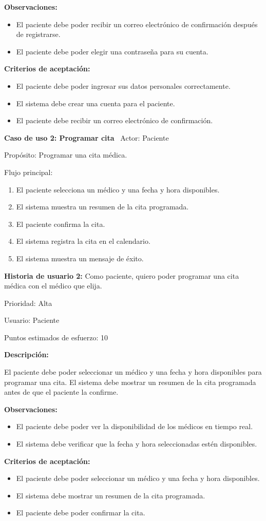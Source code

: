 \documentclass{article}
\theoremstyle{mytheoremstyle}
\theoremstyle{mytheoremstyle}
\theoremstyle{myproblemstyle}
\begin{document}
\textbf {Observaciones:}

\begin{itemize}
    \item El paciente debe poder recibir un correo electrónico de confirmación después de registrarse.
    \item El paciente debe poder elegir una contraseña para su cuenta.
\end{itemize} 
\textbf{Criterios de aceptación:}
\begin{itemize}
    \item El paciente debe poder ingresar sus datos personales correctamente.
    \item El sistema debe crear una cuenta para el paciente.
    \item El paciente debe recibir un correo electrónico de confirmación.
\end{itemize}  
\newpage 
\textbf{Caso de uso 2: Programar cita} \newline \
Actor: Paciente

Propósito: Programar una cita médica.

Flujo principal:
\begin{enumerate}
    \item El paciente selecciona un médico y una fecha y hora disponibles.
    \item El sistema muestra un resumen de la cita programada.
    \item El paciente confirma la cita.
    \item El sistema registra la cita en el calendario.
    \item El sistema muestra un mensaje de éxito.
    \end{enumerate}

    \textbf{Historia de usuario 2: }  
    Como paciente, quiero poder programar una cita médica con el médico que elija.

Prioridad: Alta

Usuario: Paciente

Puntos estimados de esfuerzo: 10

\textbf{Descripción:} 

El paciente debe poder seleccionar un médico y una fecha y hora disponibles para programar una cita. El sistema debe mostrar un resumen de la cita programada antes de que el paciente la confirme.

\textbf{ Observaciones:}
\begin{itemize}
    \item El paciente debe poder ver la disponibilidad de los médicos en tiempo real.
    \item El sistema debe verificar que la fecha y hora seleccionadas estén disponibles.
\end{itemize} 
\textbf{Criterios de aceptación:}
\begin{itemize}
    \item El paciente debe poder seleccionar un médico y una fecha y hora disponibles.
    \item El sistema debe mostrar un resumen de la cita programada.
    \item El paciente debe poder confirmar la cita.
\end{itemize}  
\end{document}
